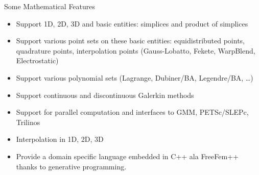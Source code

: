 \documentclass[final,utf8,,hyperref={pdfpagelabels=false}]{beamer}
\newcommand{\inputsnapshot}[1]{
  
}
\begin{document}
\begin{frame}[containsverbatim]{}
\begin{columns}[t]

    \begin{block}{Some Mathematical Features}
      \begin{itemize}
      \item Support 1D, 2D, 3D and basic entities: simplices and product of simplices
      \item Support various point sets on these basic entities: equidistributed
        points, quadrature points, interpolation points (Gauss-Lobatto, Fekete,
        WarpBlend, Electrostatic)
      \item Support various polynomial sets (Lagrange, Dubiner/BA, Legendre/BA,
        \dots)
      \item Support continuous and discontinuous Galerkin methods
      \item Support for parallel computation and interfaces to GMM, PETSc/SLEPc,
        Trilinos
      \item Interpolation in 1D, 2D, 3D
      \item Provide a domain specific language embedded in C++ ala FreeFem++
        thanks to generative programming.
      \end{itemize}
    \end{block}


\end{columns}
\end{frame}
\end{document}
